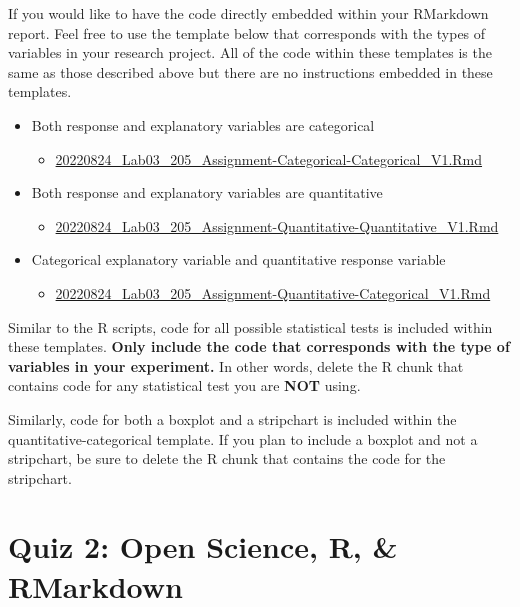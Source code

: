 \documentclass[
]{book}
\providecommand{\tightlist}{%
  \setlength{\itemsep}{0pt}\setlength{\parskip}{0pt}}
\begin{document}
If you would like to have the code directly embedded within your RMarkdown report. Feel free to use the template below that corresponds with the types of variables in your research project. All of the code within these templates is the same as those described above but there are no instructions embedded in these templates.

\begin{itemize}
\tightlist
\item
  Both response and explanatory variables are categorical

  \begin{itemize}
  \tightlist
  \item
    \href{https://osf.io/download/98vmu}{20220824\_Lab03\_205\_Assignment-Categorical-Categorical\_V1.Rmd}
  \end{itemize}
\item
  Both response and explanatory variables are quantitative

  \begin{itemize}
  \tightlist
  \item
    \href{https://osf.io/download/75q4x}{20220824\_Lab03\_205\_Assignment-Quantitative-Quantitative\_V1.Rmd}
  \end{itemize}
\item
  Categorical explanatory variable and quantitative response variable

  \begin{itemize}
  \tightlist
  \item
    \href{https://osf.io/download/2hsk5}{20220824\_Lab03\_205\_Assignment-Quantitative-Categorical\_V1.Rmd}
  \end{itemize}
\end{itemize}

Similar to the R scripts, code for all possible statistical tests is included within these templates. \textbf{Only include the code that corresponds with the type of variables in your experiment.} In other words, delete the R chunk that contains code for any statistical test you are \textbf{NOT} using.

Similarly, code for both a boxplot and a stripchart is included within the quantitative-categorical template. If you plan to include a boxplot and not a stripchart, be sure to delete the R chunk that contains the code for the stripchart.

\hypertarget{quiz-2-open-science-r-rmarkdown}{%
\chapter*{Quiz 2: Open Science, R, \& RMarkdown}\label{quiz-2-open-science-r-rmarkdown}}
\end{document}
